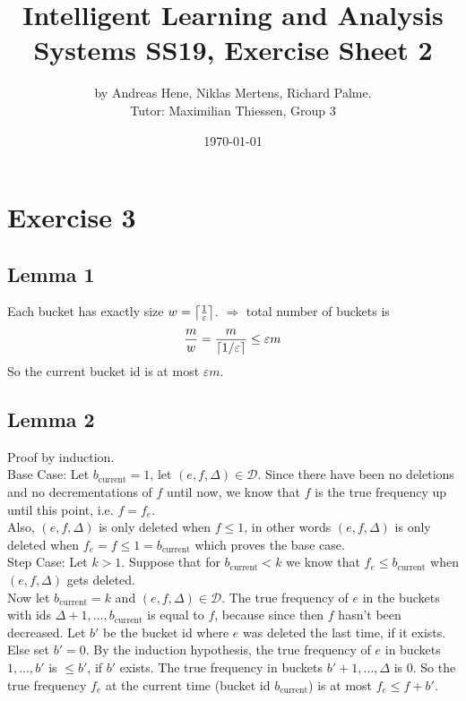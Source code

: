 \documentclass{article}
\DeclarePairedDelimiter\ceil{\lceil}{\rceil}
\begin{document}
\title{Intelligent Learning and Analysis Systems SS19, Exercise Sheet 2}
\author{by Andreas Hene, Niklas Mertens, Richard Palme.\\
Tutor: Maximilian Thiessen, Group 3}
\date{\today}
\maketitle

\section*{Exercise 3}
\subsection*{Lemma 1}
Each bucket has exactly size $ w = \ceil*{\frac{1}{\varepsilon}}$.
$\Rightarrow$ total number of buckets is
\[
\frac{m}{w} = \frac{m}{\ceil*{1/\varepsilon}} \leq \varepsilon m
\]
So the current bucket id is at most $\varepsilon m$.

\subsection*{Lemma 2}
Proof by induction. \\
Base Case: Let $b_{\text{current}} = 1$, let $(e, f, \Delta) \in \mathcal{D}$.
Since there have been no deletions and no decrementations of $f$ until now,
we know that $f$ is the true frequency up until this point, i.e. $f = f_e$. \\

Also, $(e, f, \Delta)$ is only deleted when $f \leq 1$, in other words $(e, f, \Delta)$ is only deleted when $f_e = f \leq 1 = b_{\text{current}}$ which proves the base case. \\

Step Case: Let $k > 1$. Suppose that for $b_{\text{current}} < k$ we know that $f_e \leq b_{\text{current}}$ when $(e, f, \Delta)$ gets deleted. \\

Now let $b_{\text{current}} = k$ and $(e, f, \Delta) \in \mathcal{D}$.
The true frequency of $e$ in the buckets with ids $\Delta+1, \hdots, b_{\text{current}}$
is equal to $f$, because since then $f$ hasn't been decreased.
Let $b'$ be the bucket id where $e$ was deleted the last time, if it exists.
Else set $b'=0$. By the induction hypothesis, the true frequency of $e$ in buckets
$1, \hdots, b'$ is $\leq b'$, if $b'$ exists. The true frequency in buckets
$b'+1, \hdots, \Delta$ is $0$. So the true frequency $f_e$ at the current time
(bucket id $b_{\text{current}}$) is at most $f_e \leq f + b'$. \\
\end{document}
